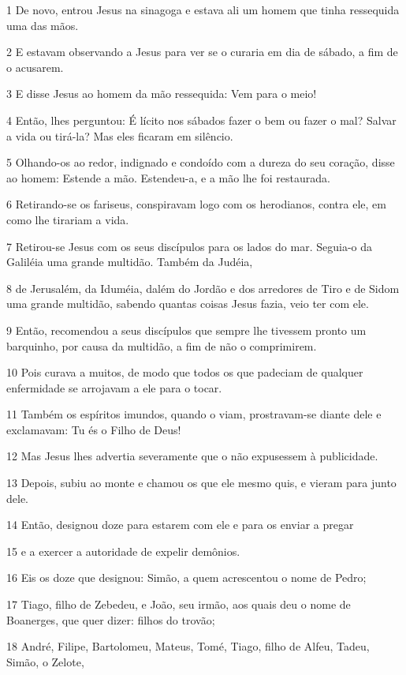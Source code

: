 \par 1 De novo, entrou Jesus na sinagoga e estava ali um homem que tinha ressequida uma das mãos.
\par 2 E estavam observando a Jesus para ver se o curaria em dia de sábado, a fim de o acusarem.
\par 3 E disse Jesus ao homem da mão ressequida: Vem para o meio!
\par 4 Então, lhes perguntou: É lícito nos sábados fazer o bem ou fazer o mal? Salvar a vida ou tirá-la? Mas eles ficaram em silêncio.
\par 5 Olhando-os ao redor, indignado e condoído com a dureza do seu coração, disse ao homem: Estende a mão. Estendeu-a, e a mão lhe foi restaurada.
\par 6 Retirando-se os fariseus, conspiravam logo com os herodianos, contra ele, em como lhe tirariam a vida.
\par 7 Retirou-se Jesus com os seus discípulos para os lados do mar. Seguia-o da Galiléia uma grande multidão. Também da Judéia,
\par 8 de Jerusalém, da Iduméia, dalém do Jordão e dos arredores de Tiro e de Sidom uma grande multidão, sabendo quantas coisas Jesus fazia, veio ter com ele.
\par 9 Então, recomendou a seus discípulos que sempre lhe tivessem pronto um barquinho, por causa da multidão, a fim de não o comprimirem.
\par 10 Pois curava a muitos, de modo que todos os que padeciam de qualquer enfermidade se arrojavam a ele para o tocar.
\par 11 Também os espíritos imundos, quando o viam, prostravam-se diante dele e exclamavam: Tu és o Filho de Deus!
\par 12 Mas Jesus lhes advertia severamente que o não expusessem à publicidade.
\par 13 Depois, subiu ao monte e chamou os que ele mesmo quis, e vieram para junto dele.
\par 14 Então, designou doze para estarem com ele e para os enviar a pregar
\par 15 e a exercer a autoridade de expelir demônios.
\par 16 Eis os doze que designou: Simão, a quem acrescentou o nome de Pedro;
\par 17 Tiago, filho de Zebedeu, e João, seu irmão, aos quais deu o nome de Boanerges, que quer dizer: filhos do trovão;
\par 18 André, Filipe, Bartolomeu, Mateus, Tomé, Tiago, filho de Alfeu, Tadeu, Simão, o Zelote,
